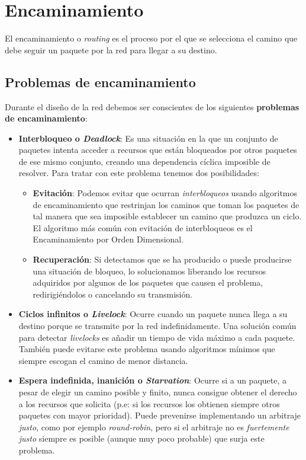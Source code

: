 \section{Encaminamiento}

El encaminamiento o \textit{routing} es el proceso por el que se selecciona el camino que debe seguir un paquete por la red para llegar a su destino.

\subsection{Problemas de encaminamiento}
\label{subsec:routing-problems}
Durante el diseño de la red debemos ser conscientes de los siguientes \textbf{problemas de encaminamiento}:

\begin{itemize}
    \item \textbf{Interbloqueo o \textit{Deadlock}}: Es una situación en la que un conjunto de paquetes intenta acceder a recursos que están bloqueados por otros paquetes de ese mismo conjunto, creando una dependencia cíclica imposible de resolver. Para tratar con este problema tenemos dos posibilidades:
    \begin{itemize}
        \item \textbf{Evitación}: Podemos evitar que ocurran \textit{interbloqueos} usando algoritmos de encaminamiento que restrinjan los caminos que toman los paquetes de tal manera que sea imposible establecer un camino que produzca un ciclo. El algoritmo más común con evitación de interbloqueos es el Encaminamiento por Orden Dimensional.
        \item \textbf{Recuperación}: Si detectamos que se ha producido o puede producirse una situación de bloqueo, lo solucionamos liberando los recursos adquiridos por algunos de los paquetes que causen el problema, redirigiéndolos o cancelando su transmisión.
    \end{itemize}
    \item \textbf{Ciclos infinitos o \textit{Livelock}}: Ocurre cuando un paquete nunca llega a su destino porque se transmite por la red indefinidamente. Una solución común para detectar \textit{livelocks} es añadir un tiempo de vida máximo a cada paquete. También puede evitarse este problema usando algoritmos mínimos que siempre escogan el camino de menor distancia.
    \item \textbf{Espera indefinida, inanición o \textit{Starvation}}: Ocurre si a un paquete, a pesar de elegir un camino posible y finito, nunca consigue obtener el derecho a los recursos que solicita (p.e: si los recursos los obtienen siempre otros paquetes con mayor prioridad). Puede prevenirse implementando un arbitraje \textit{justo}, como por ejemplo \textit{round-robin}, pero si el arbitraje no es \textit{fuertemente justo} siempre es posible (aunque muy poco probable) que surja este problema.
\end{itemize}

